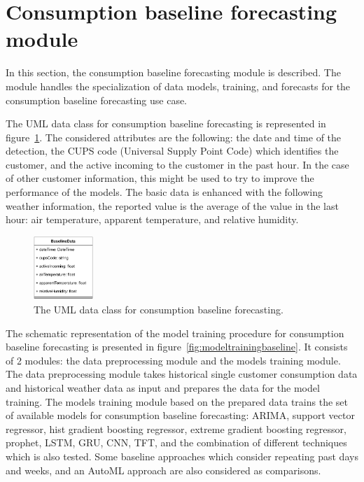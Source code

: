 \section{Consumption baseline forecasting module}
\label{sec:baselinemodel}
\vspace{0.2 cm}

In this section, the consumption baseline forecasting module is described.
The module handles the specialization of data models, training, and forecasts for the consumption baseline forecasting use case.

The UML data class for consumption baseline forecasting is represented in figure~\ref{fig:umlbaseline}.
The considered attributes are the following: the date and time of the detection, the CUPS code (Universal Supply Point Code) which identifies the customer, and the active incoming to the customer in the past hour.
In the case of other customer information, this might be used to try to improve the performance of the models.
The basic data is enhanced with the following weather information, the reported value is the average of the value in the last hour: air temperature, apparent temperature, and relative humidity.

\begin{figure}[H]
\centering
\includegraphics[width=0.20\textwidth]{images/baseline_uml}
\caption{The UML data class for consumption baseline forecasting.}
\label{fig:umlbaseline}
\end{figure}

The schematic representation of the model training procedure for consumption baseline forecasting is presented in figure~\ref{fig:modeltrainingbaseline}.
It consists of 2 modules: the data preprocessing module and the models training module.
The data preprocessing module takes historical single customer consumption data and historical weather data as input and prepares the data for the model training.
The models training module based on the prepared data trains the set of available models for consumption baseline forecasting: ARIMA, support vector regressor, hist gradient boosting regressor, extreme gradient boosting regressor, prophet, LSTM, GRU, CNN, TFT, and the combination of different techniques which is also tested.
Some baseline approaches which consider repeating past days and weeks, and an AutoML approach are also considered as comparisons.


